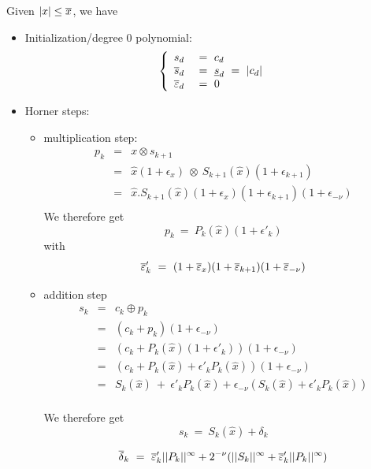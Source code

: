 Given $ |x| \leq {\overline{x}}$, we have

\begin{itemize}
\item Initialization/degree 0 polynomial: 
  $$ \left\{
    \begin{array}{rl}
      s_d & \ = \ c_d\\
      \overline{s}_{d} & \ = \ \underline{s}_{d} \ = \ |c_d|\\
      {\overline{\varepsilon}}_d &\ = \ 0\\
    \end{array}
  \right.
  $$

\item Horner steps: 
  \begin{itemize}
  \item multiplication step:%
    \begin{eqnarray*}
      p_{k}  &=& x \otimes s_{k+1} \\
             &=& \hat{x}(1+\epsilon_x)\ \otimes \ S_{k+1}(\hat{x})(1 + \epsilon_{k+1})\\
             &=& \hat{x}.S_{k+1}(\hat{x})(1+\epsilon_x)(1 + \epsilon_{k+1})(1+\epsilon_{-\nu})\\
    \end{eqnarray*}
    We therefore get 
    \begin{equation}
      p_{k} \ = \ P_{k}(\hat{x})(1+\epsilon'_k)\label{eq:pk}
    \end{equation}
    with 
    \begin{equation}
      {\overline{\varepsilon}}'_k \ = \ (1+{\overline{\varepsilon}}_x)(1 + {\overline{\varepsilon}}_{k+1})(1+{\overline{\varepsilon}}_{-\nu})\label{eq:maxepsp}
    \end{equation}
    
  \item addition step 
      \begin{eqnarray*}
        s_{k} &=&  c_k \oplus p_k \\
              &=& (c_k + p_k)(1+\epsilon_{-\nu})\\
              &=&  (c_k + P_k(\hat{x})(1+\epsilon'_k))(1+\epsilon_{-\nu})\\
              &=&  (c_k + P_k(\hat{x}) + \epsilon'_k P_k(\hat{x}))(1+\epsilon_{-\nu})\\
              &=&  S_{k}(\hat{x})\  +\  \epsilon'_k P_k(\hat{x}) + \epsilon_{-\nu}(S_k(\hat{x}) + \epsilon'_k P_k(\hat{x}))  \\
      \end{eqnarray*}

    We therefore get 
      \begin{equation}
        s_{k} \ = \  S_{k}(\hat{x}) + \delta_k \label{eq:sk}
      \end{equation}
      
      \begin{equation}
        {\overline{\delta}}_k  \ = \  {\overline{\varepsilon}}'_k||{P_{k}}||^{\infty} + 2^{-\nu}(||{S_{k}}||^{\infty} + {\overline{\varepsilon}}'_k||{P_{k}}||^{\infty})\label{eq:maxdelta}
      \end{equation}
    \end{itemize}
  \end{itemize}
  

